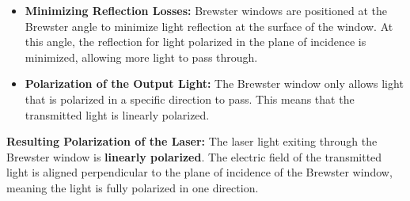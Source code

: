 \documentclass{article}
\begin{document}
\begin{itemize}
    \item \textbf{Minimizing Reflection Losses:} Brewster windows are positioned at the Brewster angle to minimize light reflection at the surface of the window. At this angle, the reflection for light polarized in the plane of incidence is minimized, allowing more light to pass through.
    \item \textbf{Polarization of the Output Light:} The Brewster window only allows light that is polarized in a specific direction to pass. This means that the transmitted light is linearly polarized.
\end{itemize}

\textbf{Resulting Polarization of the Laser:} The laser light exiting through the Brewster window is \textbf{linearly polarized}. The electric field of the transmitted light is aligned perpendicular to the plane of incidence of the Brewster window, meaning the light is fully polarized in one direction.
\end{document}
